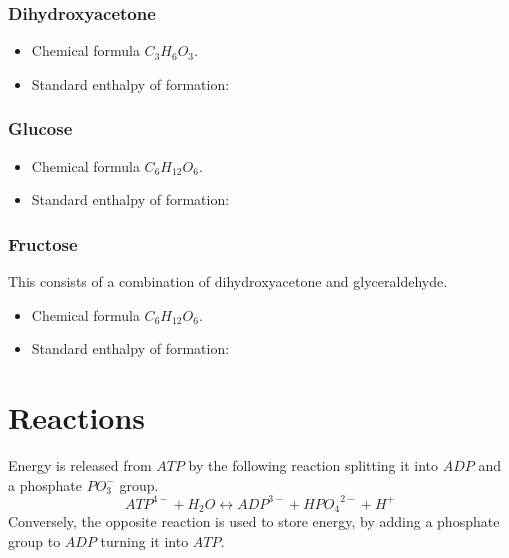 \documentclass{article}
\begin{document}
\subsubsection{Dihydroxyacetone}
\begin{itemize}
    \item Chemical formula $C_3H_6O_3$.
    \item Standard enthalpy of formation:
\end{itemize}

\subsubsection{Glucose}
\begin{itemize}
    \item Chemical formula $C_6H_{12}O_6$.
    \item Standard enthalpy of formation:
\end{itemize}

\subsubsection{Fructose}
This consists of a combination of dihydroxyacetone and glyceraldehyde.

\begin{itemize}
    \item Chemical formula $C_6H_{12}O_6$.
    \item Standard enthalpy of formation:
\end{itemize}



\pagebreak
\section{Reactions}\label{sec_reactions}

Energy is released from $ATP$ by the following reaction splitting it into $ADP$ and a
phosphate $PO_3^-$ group.
\[
    {ATP}^{4-} + H_2O \leftrightarrow {ADP}^{3-} + {HPO_4}^{2-} + H^+
\]
Conversely, the opposite reaction is used to store energy, by adding a phosphate group to
$ADP$ turning it into $ATP$.
\end{document}
